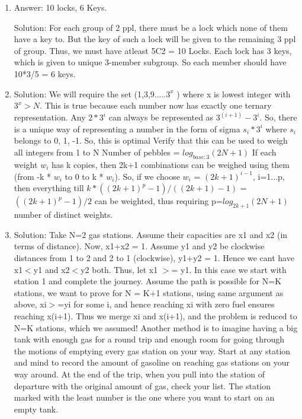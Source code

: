 \begin{enumerate}

\item
Answer: 10 locks, 6 Keys.
 
Solution: For each group of 2 ppl, there must be a lock which none of them have a key to. But the key of such a lock will be given to the remaining 3 ppl of group. Thus, we must have atleast 5C2 = 10 Locks. Each lock has 3 keys, which is given to unique 3-member subgroup. So each member should have 10*3/5 = 6 keys.




\item
Solution: We will require the set (1,3,9.....$3^x$ )
where x is lowest integer with $3^x > N$. This is true because each number now has exactly one ternary representation. Any $2 * 3^i$ can always be represented as $3^(i+1) - 3^i$. So, there is a unique way of representing a number in the form of sigma $s_i * 3^i$ where $s_i$ belongs to {0, 1, -1}. So, this is optimal
Verify that this can be used to weigh all integers from 1 to N
Number of pebbles = $log_{base:3} (2N+1)$
If each weight $w_i$ has k copies, then 2k+1 combinations can be weighed using them (from -k * $w_i$ to 0 to k * $w_i$). So, if we choose $w_i$ = $(2k+1)^{i-1}$, i=1...p, then everything till $k*((2k+1)^p - 1)/((2k+1)-1)$ = $((2k+1)^p-1)/2$ can be weighted, thus requiring p=$log_{2k+1} (2N+1)$ number of distinct weights.




\item
Solution: Take N=2 gas stations. Assume their capacities are x1 and x2 (in terms of distance). Now, x1+x2 = 1. Assume y1 and y2 be clockwise distances from 1 to 2 and 2 to 1 (clockwise), y1+y2 = 1. Hence we cant have x1$<$y1 and x2$<$y2 both. Thus, let x1 $>$= y1. In this case we start with station 1 and complete the journey. Assume the path is possible for N=K stations, we want to prove for N = K+1 stations, using same argument as above, xi$>$=yi for some i, and hence reaching xi with zero fuel ensures reaching x(i+1). Thus we merge xi and x(i+1), and the problem is reduced to N=K stations, which we assumed!
Another method is to imagine having a big tank with enough gas for a round trip and enough room for going through the motions of emptying every gas station on your way. Start at any station and mind to record the amount of gasoline on reaching gas stations on your way around. At the end of the trip, when you pull into the station of departure with the original amount of gas, check your list. The station marked with the least number is the one where you want to start on an empty tank.




\end{enumerate}
